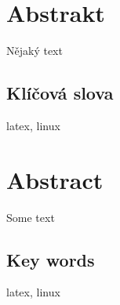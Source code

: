 \section*{Abstrakt}
Nějaký text

\subsection*{Klíčová slova}
latex, linux

\section*{Abstract}
Some text

\subsection*{Key words}
latex, linux
